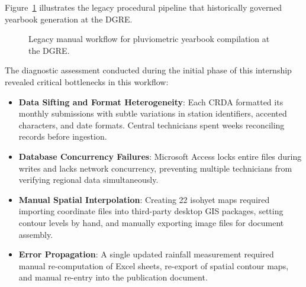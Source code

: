 \documentclass[12pt,a4paper]{report}
\begin{document}
Figure~\ref{fig:current_workflow} illustrates the legacy procedural pipeline that historically governed yearbook generation at the DGRE.

\begin{figure}[htbp]
\centering
{}
\caption{Legacy manual workflow for pluviometric yearbook compilation at the DGRE.}
\label{fig:current_workflow}
\end{figure}

The diagnostic assessment conducted during the initial phase of this internship revealed critical bottlenecks in this workflow:
\begin{itemize}
  \item \textbf{Data Sifting and Format Heterogeneity}: Each CRDA formatted its monthly submissions with subtle variations in station identifiers, accented characters, and date formats. Central technicians spent weeks reconciling records before ingestion.
  \item \textbf{Database Concurrency Failures}: Microsoft Access locks entire files during writes and lacks network concurrency, preventing multiple technicians from verifying regional data simultaneously.
  \item \textbf{Manual Spatial Interpolation}: Creating 22 isohyet maps required importing coordinate files into third-party desktop GIS packages, setting contour levels by hand, and manually exporting image files for document assembly.
  \item \textbf{Error Propagation}: A single updated rainfall measurement required manual re-computation of Excel sheets, re-export of spatial contour maps, and manual re-entry into the publication document.
\end{itemize}
\end{document}
